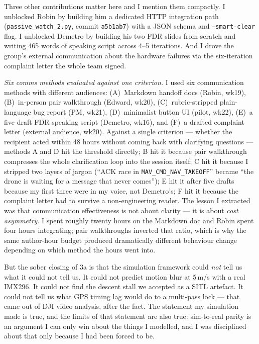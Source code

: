 Three other contributions matter here and I mention them compactly. I unblocked Robin by building him a dedicated HTTP integration path (\texttt{passive\_watch\_2.py}, commit \texttt{a5b1ab7}) with a JSON schema and \texttt{--smart-clear} flag. I unblocked Demetro by building his two FDR slides from scratch and writing 465 words of speaking script across 4--5 iterations. And I drove the group's external communication about the hardware failures via the six-iteration complaint letter the whole team signed.

\emph{Six comms methods evaluated against one criterion.} I used six communication methods with different audiences: (A)~Markdown handoff docs (Robin, wk19), (B)~in-person pair walkthrough (Edward, wk20), (C)~rubric-stripped plain-language bug report (PM, wk21), (D)~minimalist button UI (pilot, wk22), (E)~a five-draft FDR speaking script (Demetro, wk16), and (F)~a drafted complaint letter (external audience, wk20). Against a single criterion --- whether the recipient acted within 48 hours without coming back with clarifying questions --- methods A and D hit the threshold directly; B hit it because pair walkthrough compresses the whole clarification loop into the session itself; C hit it because I stripped two layers of jargon (``ACK race in \texttt{MAV\_CMD\_NAV\_TAKEOFF}'' became ``the drone is waiting for a message that never comes''); E hit it after five drafts because my first three were in my voice, not Demetro's; F hit it because the complaint letter had to survive a non-engineering reader. The lesson I extracted was that communication effectiveness is not about clarity --- it is about \emph{cost asymmetry}. I spent roughly twenty hours on the Markdown doc and Robin spent four hours integrating; pair walkthroughs inverted that ratio, which is why the same author-hour budget produced dramatically different behaviour change depending on which method the hours went into.

But the sober closing of 3a is that the simulation framework could \emph{not} tell us what it could not tell us. It could not predict motion blur at 5\,m/s with a real IMX296. It could not find the descent stall we accepted as a SITL artefact. It could not tell us what GPS timing lag would do to a multi-pass lock --- that came out of DJI video analysis, after the fact. The statement my simulation made is true, and the limits of that statement are also true: sim-to-real parity is an argument I can only win about the things I modelled, and I was disciplined about that only because I had been forced to be.


